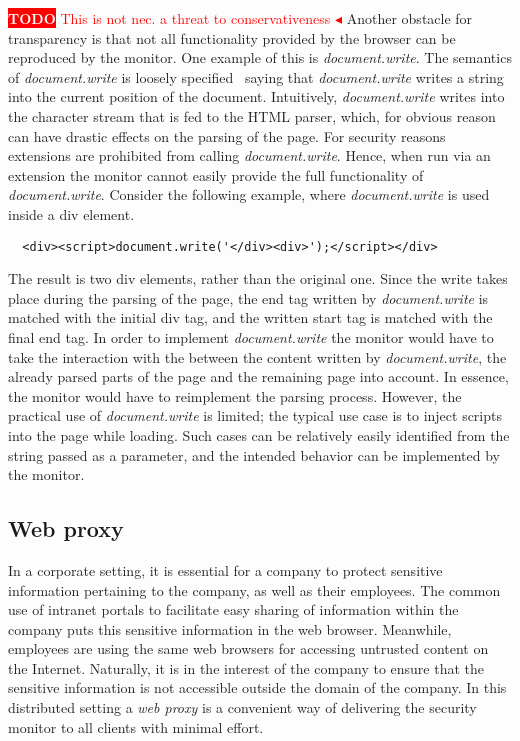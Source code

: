 \documentclass{llncs}
\newcommand{\todo}[1]{\colorbox{red}{\textcolor{white}{\sffamily\bfseries\scriptsize TODO}} \textcolor{red}{#1} \textcolor{red}{$\blacktriangleleft$}}
\begin{document}
\todo{This is not nec. a threat to conservativeness}
Another obstacle for transparency is that not all
functionality provided by the browser can be reproduced by the monitor. One
example of this is \emph{document.write}. The semantics of
\emph{document.write} is loosely specified~\cite{DOM:LVL2} saying that \emph{document.write}
writes a string into the current position of the document.  Intuitively,
\emph{document.write} writes into the character stream that is fed to the HTML
parser, which, for obvious reason can have drastic effects on the parsing of
the page. For security reasons extensions are prohibited from calling
\emph{document.write}. Hence, when run via an extension the monitor cannot
easily provide the full functionality of \emph{document.write}.
Consider the following example, where \emph{document.write} is used inside
a div element.

\begin{verbatim}
  <div><script>document.write('</div><div>');</script></div>
\end{verbatim}

The result is two div elements, rather than the original one. Since the write
takes place during the parsing of the page, the end tag written by
\emph{document.write} is matched with the initial div tag, and the written
start tag is matched with the final end tag. In order to implement
\emph{document.write} the monitor would have to take the interaction with the
between the content written by \emph{document.write}, the already parsed parts
of the page and the remaining page into account. In essence, the monitor would
have to reimplement the parsing process.  However, the practical use of
\emph{document.write} is limited; the typical use case is to inject scripts
into the page while loading. Such cases can be relatively easily identified
from the string passed as a parameter, and the intended behavior can be
implemented by the monitor.




\subsection{Web proxy}

In a corporate setting, it is essential for a company to protect 
sensitive information pertaining to the company, as well as their employees. 
The common use of intranet portals to facilitate easy sharing of information 
within the company puts this sensitive information in the web browser. 
Meanwhile, employees are using the same web browsers for accessing untrusted content on 
the Internet. Naturally, it is in the interest of the company to ensure that 
the sensitive information is not accessible outside the domain of the company.
In this distributed setting a \emph{web proxy} is a convenient way of delivering 
the security monitor to all clients with minimal effort. 
\end{document}
